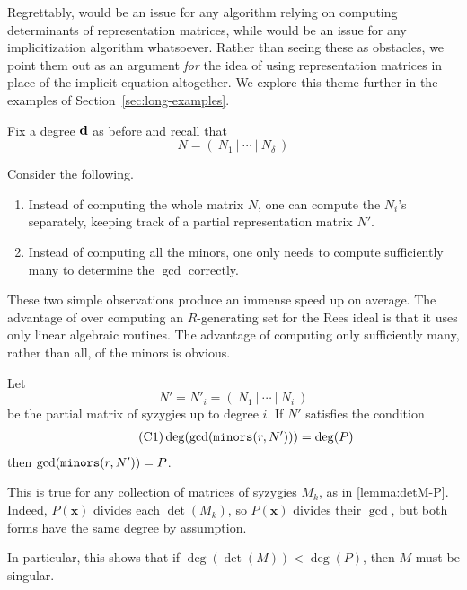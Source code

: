 \documentclass[fleqn,reqno]{amsart}
\begin{document}
\begin{paragraf*}
Regrettably,
 would be an issue for any algorithm
relying on computing determinants of representation matrices,
while 
would be an issue for any implicitization algorithm whatsoever.
Rather than seeing these as obstacles,
we point them out as an argument {\em for} the idea of using
representation matrices in place of the implicit equation altogether.
We explore this theme further in the examples of Section~\ref{sec:long-examples}.
\end{paragraf*}

\begin{paragraf}
\label{par:proposed}
Fix a degree $\mathbf d$ as before and recall that
\[
	N=(~N_1~|~\cdots~|~N_\delta~)
\]

Consider the following.
\begin{enumerate}
\item
\label{itm:N'}
Instead of computing the whole matrix $N$, one can compute the $N_i$'s separately,
keeping track of a partial representation matrix $N'$.
\item
\label{itm:gcd}
Instead of computing all the minors, one only needs to compute sufficiently many to determine
the $\gcd$ correctly.
\end{enumerate}
\end{paragraf}

\begin{paragraf*}
These two simple observations produce an immense speed up on average.
The advantage of  over computing an $R$-generating set for the
Rees ideal is that it uses only linear algebraic routines.
The advantage of computing only sufficiently many, rather than all, of the minors is obvious.
\end{paragraf*}

\begin{paragraf}
Let
\[
	N'=N'_i=(~N_1~|~\cdots~|~N_i~)
\]
be the partial matrix of syzygies up to degree $i$.
If $N'$ satisfies the condition
\begin{align}
	\label{C:matrix}
	\tag{C1}
	\deg(\gcd(\mathop{\tt minors}(r,N')))=\deg(P)
\end{align}
then $\gcd(\mathop{\tt minors}(r,N'))=P$.

This is true for any collection of matrices of syzygies $M_k$, as in \eqref{lemma:detM-P}.
Indeed, $P(\mathbf x)$ divides each $\det(M_k)$, so $P(\mathbf x)$ divides their $\gcd$,
but both forms have the same degree by assumption.

In particular, this shows that if $\deg(\det(M))<\deg(P)$, then $M$ must be singular.
\end{paragraf}
\end{document}
